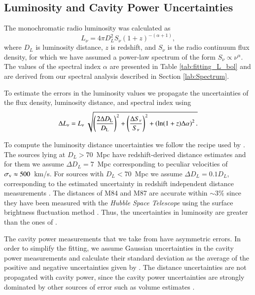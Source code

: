\documentclass{aa}  %
\begin{document}
\subsection{Luminosity and Cavity Power Uncertainties}

The monochromatic radio luminosity was calculated as 
\begin{equation} \label{equ:L_nu_formula}
	L_{\nu}= 4 \pi D_{L}^2 S_{\nu} (1+z)^{-(\alpha+1)},
\end{equation}
where $D_{L}$ is luminosity distance, $z$ is redshift, and $S_{\nu}$ is the radio continuum flux density,
for which we have assumed a power-law spectrum of the form $S_{\nu} \propto \nu^{\alpha}$.  
The values of the spectral index $\alpha$ are presented in Table \ref{tab:fitting_L_bol} and are derived from our spectral analysis described in Section \ref{lab:Spectrum}. 

To estimate the errors in the luminosity values we propagate the uncertainties of the flux density, luminosity distance, and spectral index using
\begin{equation}
\Delta L_{\rm{\nu}} = L_{\rm{\nu}} ~ \sqrt{\left(  \frac{2 \Delta D_{\rm{L}}}{D_{\rm{L}}} \right)^2 + \left( \frac{\Delta S_{\rm{\nu}}}{S_{\rm{\nu}}} \right)^2  + \left( \ln (1+z) \Delta\alpha \right)^2.} 
\end{equation}
 
To compute the luminosity distance uncertainties we follow the recipe used by \cite{Leith2016}.
The sources lying at $D_L > 70$~Mpc have redshift-derived distance estimates and for them we assume $\Delta D_L = 7$~Mpc corresponding to peculiar velocities of $\sigma_{\rm v} \approx 500$~km/s. 
For sources with $D_L < 70$~Mpc we assume $\Delta D_L = 0.1 D_L$, corresponding to the estimated uncertainty in redshift independent distance measurements  \citep{Cappellari2011}. 
The distances of M84 and M87 are accurate within $\sim 3 \%$ since they have been measured with the \textit{Hubble Space Telescope} using the surface brightness fluctuation method \citep{Blakeslee2009}. 
Thus, the uncertainties in luminosity are greater than the ones of \cite{Birzan2008}.

The cavity power measurements that we take from \cite{Rafferty2006} have asymmetric errors.
In order to simplify the fitting, we assume Gaussian uncertainties in the cavity power measurements and calculate their standard deviation as the average of the positive and negative uncertainties given by \cite{Rafferty2006}.
The distance uncertainties are not propagated with cavity power, since the cavity power uncertainties are strongly dominated by other sources of error such as volume estimates \citep{O'Sullivan2011}.
\end{document}
